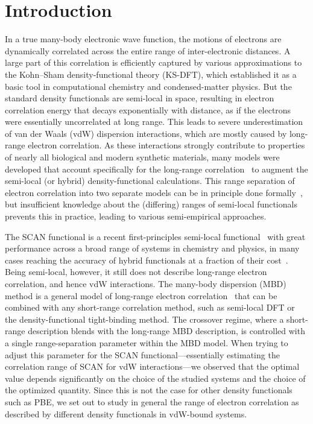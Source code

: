 \section{Introduction}

In a true many-body electronic wave function, the motions of electrons are dynamically correlated across the entire range of inter-electronic distances.
A large part of this correlation is efficiently captured by various approximations to the Kohn--Sham density-functional theory (KS-DFT), which established it as a basic tool in computational chemistry and condensed-matter physics.
But the standard density functionals are semi-local in space, resulting in electron correlation energy that decays exponentially with distance, as if the electrons were essentially uncorrelated at long range.
This leads to severe underestimation of van der Waals (vdW) dispersion interactions, which are mostly caused by long-range electron correlation.
As these interactions strongly contribute to properties of nearly all biological and modern synthetic materials, many models were developed that account specifically for the long-range correlation~\cite{DionPRL04,VydrovJCP10a,BeckeJCP07,TkatchenkoPRL09,GrimmeJCP10,AmbrosettiJCP14} to augment the semi-local (or hybrid) density-functional calculations.
This range separation of electron correlation into two separate models can be in principle done formally~\cite{HermannCR17}, but insufficient knowledge about the (differing) ranges of semi-local functionals prevents this in practice, leading to various semi-empirical approaches.

The SCAN functional is a recent first-principles semi-local functional~\cite{SunPRL15} with great performance across a broad range of systems in chemistry and physics, in many cases reaching the accuracy of hybrid functionals at a fraction of their cost~\cite{SunNC16}.
Being semi-local, however, it still does not describe long-range electron correlation, and hence vdW interactions.
The many-body dispersion (MBD) method is a general model of long-range electron correlation~\cite{TkatchenkoPRL12,AmbrosettiJCP14} that can be combined with any short-range correlation method, such as semi-local DFT or the density-functional tight-binding method.
The crossover regime, where a short-range description blends with the long-range MBD description, is controlled with a single range-separation parameter within the MBD model.
When trying to adjust this parameter for the SCAN functional---essentially estimating the correlation range of SCAN for vdW interactions---we observed that the optimal value depends significantly on the choice of the studied systems and the choice of the optimized quantity.
Since this is not the case for other density functionals such as PBE, we set out to study in general the range of electron correlation as described by different density functionals in vdW-bound systems.

